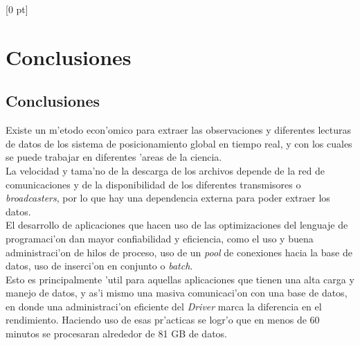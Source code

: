 \titlespacing{\chapter}{0 pt}{30 pt}{50 pt}[0 pt]
\titleformat{\section}{\Large\bfseries}{\thesection}{0 pt}{\hspace{30 pt}}
\titleformat{\subsection}{\large\bfseries}{\thesubsection}{0 pt}{\hspace{30 pt}}
\pagestyle{fancy}
\fancyhead[LO,LE]{\footnotesize\emph{\leftmark}}
\fancyhead[RO,RE]{\thepage}
\fancyfoot[CO,CE]{}

\chapter{Conclusiones} %

\normalsize
\section{Conclusiones}
\noindent
Existe un m'etodo econ'omico para extraer las observaciones y diferentes lecturas de datos de los sistema de posicionamiento global en tiempo real, y con los cuales se puede trabajar en diferentes 'areas de la ciencia.\\

La velocidad y tama'no de la descarga de los archivos depende de la red de comunicaciones y de la disponibilidad de los diferentes transmisores o \emph{broadcasters}, por lo que hay una dependencia externa para poder extraer los datos. \\

El desarrollo de aplicaciones que hacen uso de las optimizaciones del lenguaje de programaci'on dan mayor confiabilidad y eficiencia, como el uso y buena administraci'on de hilos de proceso, uso de un \emph{pool} de conexiones hacia la base de datos, uso de inserci'on en conjunto o \emph{batch}. \\
Esto es principalmente 'util para aquellas aplicaciones que tienen una alta carga y manejo de datos, y as'i mismo una masiva   comunicaci'on con una base de datos, en donde una administraci'on eficiente del \emph{Driver} marca la diferencia en el rendimiento. Haciendo uso de esas pr'acticas se logr'o que en menos de 60 minutos se procesaran alrededor de 81 GB de datos.\\


